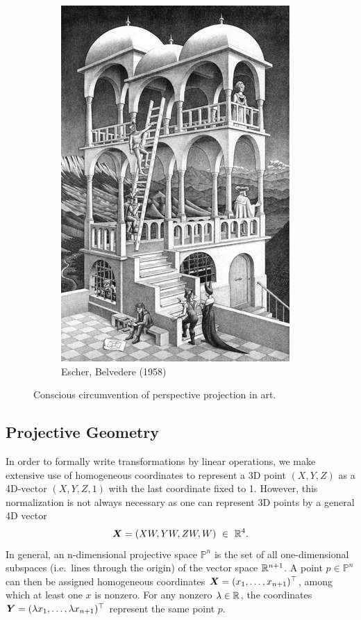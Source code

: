 \begin{figure}[h]
\begin{subfigure}[b]{0.42\textwidth}
	\includegraphics[width=\textwidth]{assets/img/escher_belvedere.jpg}
	\caption{Escher, Belvedere (1958)}%
	\label{fig:escher_belvedere}
\end{subfigure}
\caption{Conscious circumvention of perspective projection in art.}%
\end{figure}


\subsection{Projective Geometry}%
\label{sub:projective_geometry}


In order to formally write transformations by linear operations,
we make extensive use of homogeneous coordinates to represent
a 3D point $(X,Y,Z)$ as a 4D-vector $(X,Y,Z,1)$ with the last coordinate fixed to 1.
However, this normalization is not always necessary as one can represent 3D points
by a general 4D vector
\[
	\bm{X} = (XW, YW, ZW, W)\ \in\ \R^4.
\]
In general, an n-dimensional projective space $\mathbb{P}^n$
is the set of all one-dimensional subspaces (i.e.\ lines through the origin)
of the vector space $\mathbb{R}^{n+1}$.
A point $p \in \mathbb{P}^n$ can then be assigned homogeneous coordinates
$\bm{X} = (x_1, \ldots, x_{n+1})^{\top}$, among which at least one $x$ is nonzero.
For any nonzero $\lambda \in \mathbb{R}$, the coordinates
$\bm{Y} = (\lambda x_1, \ldots, \lambda x_{n+1})^{\top}$
represent the same point $p$.



